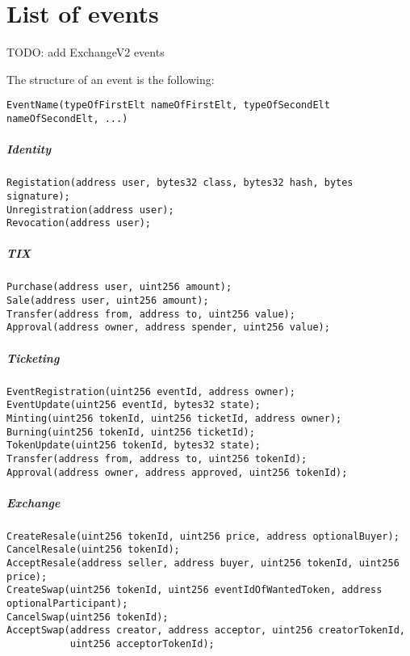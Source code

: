 \documentclass[a4paper,11pt,oneside]{report}
\begin{document}
\cleardoublepage
{}
{}
\nocite{*}
\printbibliography

\appendix
\chapter{List of events}
\label{sec:appendix_a}

TODO: add ExchangeV2 events

The structure of an event is the following: 
\begin{verbatim}
EventName(typeOfFirstElt nameOfFirstElt, typeOfSecondElt nameOfSecondElt, ...)
\end{verbatim}



\paragraph{Identity}
\begin{verbatim}
Registation(address user, bytes32 class, bytes32 hash, bytes signature);
Unregistration(address user);
Revocation(address user);
\end{verbatim}

\paragraph{TIX}
\begin{verbatim}
Purchase(address user, uint256 amount);
Sale(address user, uint256 amount);
Transfer(address from, address to, uint256 value);
Approval(address owner, address spender, uint256 value);
\end{verbatim}

\paragraph{Ticketing}
\begin{verbatim}
EventRegistration(uint256 eventId, address owner);
EventUpdate(uint256 eventId, bytes32 state);
Minting(uint256 tokenId, uint256 ticketId, address owner);
Burning(uint256 tokenId, uint256 ticketId);
TokenUpdate(uint256 tokenId, bytes32 state);
Transfer(address from, address to, uint256 tokenId);
Approval(address owner, address approved, uint256 tokenId);
\end{verbatim}

\paragraph{Exchange}
\begin{verbatim}
CreateResale(uint256 tokenId, uint256 price, address optionalBuyer);
CancelResale(uint256 tokenId);
AcceptResale(address seller, address buyer, uint256 tokenId, uint256 price);
CreateSwap(uint256 tokenId, uint256 eventIdOfWantedToken, address optionalParticipant);
CancelSwap(uint256 tokenId);
AcceptSwap(address creator, address acceptor, uint256 creatorTokenId, 
           uint256 acceptorTokenId);
\end{verbatim}
\end{document}

